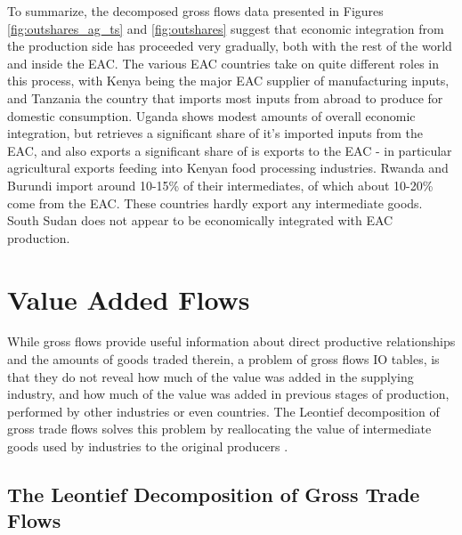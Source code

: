 \documentclass[a4paper]{article}
\begin{document}
To summarize, the decomposed gross flows data presented in Figures \ref{fig:outshares_ag_ts} and \ref{fig:outshares} suggest that economic integration from the production side has proceeded very gradually, both with the rest of the world and inside the EAC. The various EAC countries take on quite different roles in this process, with Kenya being the major EAC supplier of manufacturing inputs, and Tanzania the country that imports most inputs from abroad to produce for domestic consumption. Uganda shows modest amounts of overall economic integration, but retrieves a significant share of it's imported inputs from the EAC, and also exports a significant share of is exports to the EAC - in particular agricultural exports feeding into Kenyan food processing industries. Rwanda and Burundi import around 10-15\% of their intermediates, of which about 10-20\% come from the EAC. These countries hardly export any intermediate goods. South Sudan does not appear to be economically integrated with EAC production. 


\section{Value Added Flows}
While gross flows provide useful information about direct productive relationships and the amounts of goods traded therein, a problem of gross flows IO tables, is that they do not reveal how much of the value was added in the supplying industry, and how much of the value was added in previous stages of production, performed by other industries or even countries. %
The Leontief decomposition of gross trade flows solves this problem by reallocating the value of intermediate goods used by industries to the original producers \citep{Kummritz2014}. %

\subsection{The Leontief Decomposition of Gross Trade Flows}
\end{document}
